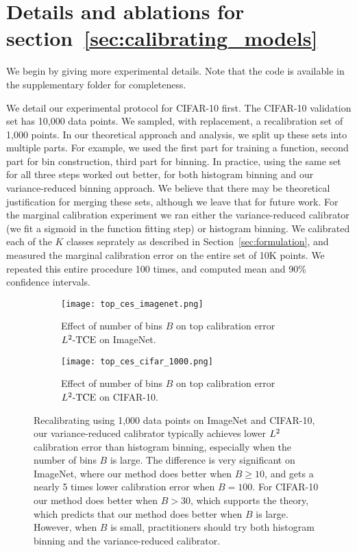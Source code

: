 \newpage
\section{Details and ablations for section~\ref{sec:calibrating_models}}
\label{sec:calibrating_models_appendix_experiments}

We begin by giving more experimental details. Note that the code is available in the supplementary folder for completeness.

We detail our experimental protocol for CIFAR-10 first. The CIFAR-10 validation set has 10,000 data points. We sampled, with replacement, a recalibration set of 1,000 points. In our theoretical approach and analysis, we split up these sets into multiple parts. For example, we used the first part for training a function, second part for bin construction, third part for binning. In practice, using the same set for all three steps worked out better, for both histogram binning and our variance-reduced binning approach. We believe that there may be theoretical justification for merging these sets, although we leave that for future work. For the marginal calibration experiment we ran either the variance-reduced calibrator (we fit a sigmoid in the function fitting step) or histogram binning. We calibrated each of the $K$ classes seprately as described in Section~\ref{sec:formulation}, and measured the marginal calibration error on the entire set of 10K points. We repeated this entire procedure 100 times, and computed mean and 90\% confidence intervals.

\begin{figure}
  \centering
  \centering
  	 \begin{subfigure}[b]{0.48\textwidth}
         \centering
         \texttt{[image: top\_ces\_imagenet.png]}
         \caption{Effect of number of bins $B$ on top calibration error $L^2\mbox{-TCE}$ on ImageNet.
         }
         \label{fig:imagenet_top_cal_var_red}
     \end{subfigure}
     \hfill
     \begin{subfigure}[b]{0.48\textwidth}
         \centering
         \texttt{[image: top\_ces\_cifar\_1000.png]}
         \caption{Effect of number of bins $B$ on top calibration error $L^2\mbox{-TCE}$ on CIFAR-10.
         }
         \label{fig:cifar_top_cal_var_red}
     \end{subfigure}
  \caption{
    Recalibrating using 1,000 data points on ImageNet and CIFAR-10, our variance-reduced calibrator typically achieves lower $L^2$ calibration error than histogram binning, especially when the number of bins $B$ is large. The difference is very significant on ImageNet, where our method does better when $B \geq 10$, and gets a nearly 5 times lower calibration error when $B = 100$. For CIFAR-10 our method does better when $B > 30$, which supports the theory, which predicts that our method does better when $B$ is large. However, when $B$ is small, practitioners should try both histogram binning and the variance-reduced calibrator.
}
  \label{fig:mse_estimators_bins}
\end{figure}

